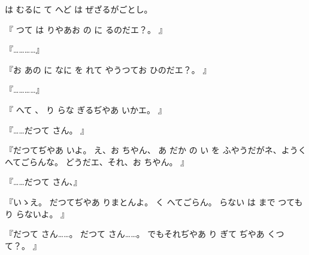 は
むるに
て
へど
は
ぜざるがごとし。

『
つて
は
りやあお
の
に
るのだエ？。
』

『…………』

『お
あの
に
なに
を
れて
やうつてお
ひのだエ？。
』

『…………』

『
へて
、
り
らな
ぎるぢやあ
いかエ。
』

『……だつて
さん。
』

『だつてぢやあ
いよ。
え、お
ちやん、
あ
だか
の
い
を
ふやうだがネ、ようく
へてごらんな。
どうだエ、それ、お
ちやん。
』

『……だつて
さん、』

『いゝえ。
だつてぢやあ
りまとんよ。
く
へてごらん。
らない
は
まで
つても
り
らないよ。
』

『だつて
さん……。
だつて
さん……。
でもそれぢやあ
り
ぎて
ぢやあ
くつて？。
』

